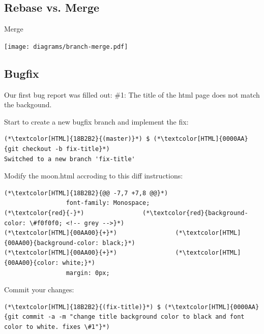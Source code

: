 \subsection{Rebase vs. Merge}
\begin{frame}[fragile]
  \subslidetitle
  Merge
  \centerline{\texttt{[image: diagrams/branch-merge.pdf]}}
\end{frame}

\subsection{Bugfix}
\begin{frame}[fragile]
  \subslidetitle

  Our first bug report was filled out:
  \newline \vspace{1em}
  \#1: The title of the html page does not match the backgound.

  Start to create a new bugfix branch and implement the fix:
  \begin{lstlisting}
(*\textcolor[HTML]{18B2B2}{(master)}*) $ (*\textcolor[HTML]{0000AA}{git checkout -b fix-title}*)
Switched to a new branch 'fix-title'
\end{lstlisting}

  Modify the moon.html accroding to this diff instructions:
  \begin{lstlisting}
(*\textcolor[HTML]{18B2B2}{@@ -7,7 +7,8 @@}*)
                 font-family: Monospace;
(*\textcolor{red}{-}*)                (*\textcolor{red}{background-color: \#f0f0f0; <!-- grey -->}*)
(*\textcolor[HTML]{00AA00}{+}*)                (*\textcolor[HTML]{00AA00}{background-color: black;}*)
(*\textcolor[HTML]{00AA00}{+}*)                (*\textcolor[HTML]{00AA00}{color: white;}*)
                 margin: 0px;
\end{lstlisting}

  Commit your changes:
  \begin{lstlisting}
(*\textcolor[HTML]{18B2B2}{(fix-title)}*) $ (*\textcolor[HTML]{0000AA}{git commit -a -m "change title background color to black and font color to white. fixes \#1"}*)
\end{lstlisting}
\end{frame}

